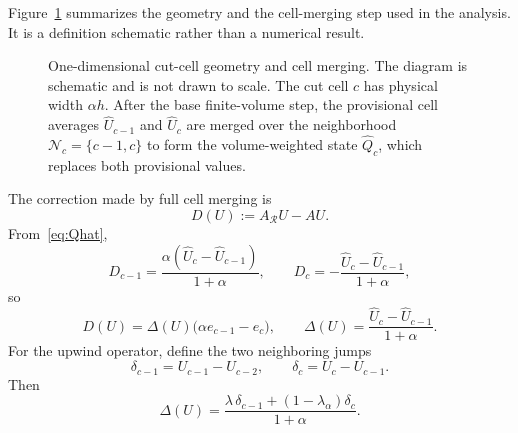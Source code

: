 \documentclass[preprint,12pt]{elsarticle}
\begin{document}
Figure~\ref{fig:model-srd} summarizes the geometry and the cell-merging step used in the analysis.  It is a definition schematic rather
than a numerical result.

\begin{figure}[ht]
\centering
{}
\caption{One-dimensional cut-cell geometry and cell merging.
The diagram is schematic and is not drawn to scale.  The cut cell $c$ has
physical width $\alpha h$.  After the base finite-volume step, the provisional
cell averages $\widehat U_{c-1}$ and $\widehat U_c$ are merged over the
neighborhood $\mathcal N_c=\{c-1,c\}$ to form the volume-weighted state
$\widehat Q_c$, which replaces both provisional values.}
\label{fig:model-srd}
\end{figure}

The correction made by full cell merging is
\[
    D(U):=A_{\mathcal R}U-AU.
\]
From~\eqref{eq:Qhat},
\[
 D_{c-1}
 =
 \frac{\alpha(\widehat U_c-\widehat U_{c-1})}{1+\alpha},
 \qquad
 D_c
 =
 -\frac{\widehat U_c-\widehat U_{c-1}}{1+\alpha},
\]
so
\begin{equation}
    D(U)=\Delta(U)\bigl(\alpha e_{c-1}-e_c\bigr),
    \qquad
    \Delta(U)=\frac{\widehat U_c-\widehat U_{c-1}}{1+\alpha}.
    \label{eq:D}
\end{equation}
For the upwind operator, define the two neighboring jumps
\[
    \delta_{c-1}=U_{c-1}-U_{c-2},
    \qquad
    \delta_c=U_c-U_{c-1}.
\]
Then
\begin{equation}
    \Delta(U)
    =
    \frac{\lambda\,\delta_{c-1}
    +(1-\lambda_\alpha)\delta_c}{1+\alpha}.
    \label{eq:Delta-jumps}
\end{equation}
\end{document}
